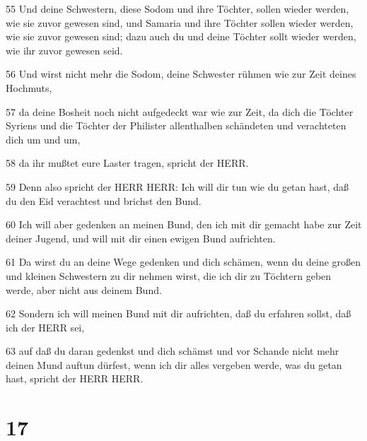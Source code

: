 \par 55 Und deine Schwestern, diese Sodom und ihre Töchter, sollen wieder werden, wie sie zuvor gewesen sind, und Samaria und ihre Töchter sollen wieder werden, wie sie zuvor gewesen sind; dazu auch du und deine Töchter sollt wieder werden, wie ihr zuvor gewesen seid.
\par 56 Und wirst nicht mehr die Sodom, deine Schwester rühmen wie zur Zeit deines Hochmuts,
\par 57 da deine Bosheit noch nicht aufgedeckt war wie zur Zeit, da dich die Töchter Syriens und die Töchter der Philister allenthalben schändeten und verachteten dich um und um,
\par 58 da ihr mußtet eure Laster tragen, spricht der HERR.
\par 59 Denn also spricht der HERR HERR: Ich will dir tun wie du getan hast, daß du den Eid verachtest und brichst den Bund.
\par 60 Ich will aber gedenken an meinen Bund, den ich mit dir gemacht habe zur Zeit deiner Jugend, und will mit dir einen ewigen Bund aufrichten.
\par 61 Da wirst du an deine Wege gedenken und dich schämen, wenn du deine großen und kleinen Schwestern zu dir nehmen wirst, die ich dir zu Töchtern geben werde, aber nicht aus deinem Bund.
\par 62 Sondern ich will meinen Bund mit dir aufrichten, daß du erfahren sollst, daß ich der HERR sei,
\par 63 auf daß du daran gedenkst und dich schämst und vor Schande nicht mehr deinen Mund auftun dürfest, wenn ich dir alles vergeben werde, was du getan hast, spricht der HERR HERR.

\chapter{17}

